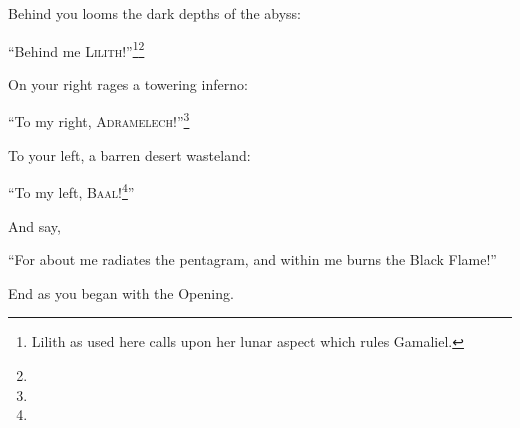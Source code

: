  Behind you looms the dark depths of the abyss:\begin{quoting}\enquote{Behind me \textsc{Lilith}!}\footnote{Lilith as used here calls upon her lunar aspect which rules Gamaliel.}\footnote{}\end{quoting}

 On your right rages a towering inferno: \begin{quoting}\enquote{To my right, \textsc{Adramelech}!}\footnote{}\end{quoting}

 To your left, a barren desert wasteland: \begin{quoting}\enquote{To my left, \textsc{Baal}!\footnote{}}\end{quoting}

 And say, \begin{quoting}\enquote{For about me radiates the pentagram, and within me burns the Black Flame!}\end{quoting}

End as you began with the Opening.

